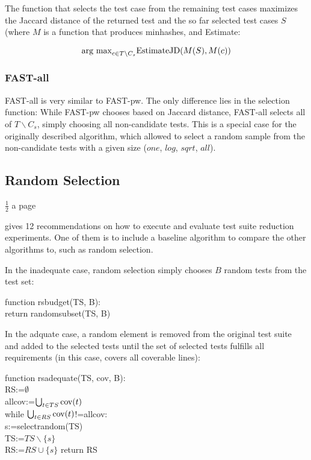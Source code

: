 
The function that selects the test case from the remaining test cases
maximizes the Jaccard distance of the returned test and the so far
selected test cases $S$ (where $M$ is a function that produces minhashes, and Estimate:

$$ \hbox{arg max}_{c \in T \backslash C_s} \hbox{EstimateJD}(M(S), M(c))$$

\subsubsection{FAST-all}

FAST-all is very similar to FAST-pw. The only difference lies in the
selection function: While FAST-pw chooses based on Jaccard distance,
FAST-all selects all of $T \backslash C_s$, simply choosing all
non-candidate tests. This is a special case for the originally described
algorithm, which allowed to select a random sample from the non-candidate
tests with a given size ($one$, $log$, $sqrt$, $all$).

\subsection{Random Selection}

$\frac{1}{2}$ a page

\cite{khan2018systematic} gives 12 recommendations on how to execute and
evaluate test suite reduction experiments. One of them is to include a
baseline algorithm to compare the other algorithms to, such as random
selection.

In the inadequate case, random selection simply chooses $B$ random tests
from the test set:

function rsbudget(TS, B): \\
	return randomsubset(TS, B)

In the adquate case, a random element is removed from the original test
suite and added to the selected tests until the set of selected tests
fulfills all requirements (in this case, covers all coverable lines):

function rsadequate(TS, cov, B): \\
	RS:=$\emptyset$ \\
	allcov:=$\bigcup_{t \in TS} \hbox{cov}(t)$ \\
	while $\bigcup_{t \in RS} \hbox{cov}(t)$!=allcov: \\
		s:=selectrandom(TS) \\
		TS:=$TS \backslash \{s\}$ \\
		RS:=$RS \cup \{s\}$
	return RS

